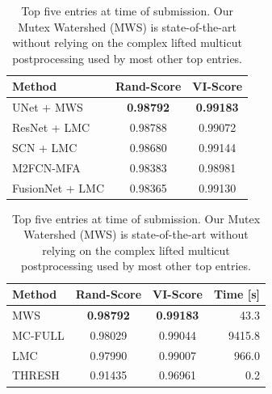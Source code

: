 
\begin{table}[t]
    \centering
    \begin{subtable}[t!]{0.48\textwidth}\centering
        \begin{tabular}{l c c}
            \toprule
            Method                                  & \hspace{-0.5cm}Rand-Score & VI-Score \\        
            \midrule
            UNet + MWS                              & \textbf{0.98792} & \textbf{0.99183}\\        
            ResNet + LMC \cite{xiao2018deep}        & 0.98788   &  0.99072\\
            SCN + LMC \cite{weiler2017learning}     & 0.98680   &  0.99144\\
            M2FCN-MFA \cite{shen2017multi}         & 0.98383   &  0.98981\\
            FusionNet + LMC \cite{quan2016fusionnet}& 0.98365   &  0.99130\\ 
        \end{tabular}
        \caption{Top five entries at time of submission. Our Mutex Watershed (MWS) is state-of-the-art without relying on the complex lifted multicut postprocessing used by most other top entries.}
        \label{tab:isbi-leaderboard}
    \end{subtable} \quad 
    \par\bigskip
    \begin{subtable}[t!]{0.48\textwidth}\centering
        \begin{tabular}{l c c r}
            \toprule
            Method   & \hspace{-0.5cm}Rand-Score & VI-Score & Time [s] \\        
            \midrule
            MWS      & \textbf{0.98792} & \textbf{0.99183} & 43.3 \\        
            MC-FULL  & 0.98029   & 0.99044 & 9415.8 \\
		    LMC		 & 0.97990   & 0.99007 &  966.0 \\
            THRESH   & 0.91435   & 0.96961 & 0.2 \\

\end{tabular}
\end{subtable}
\end{table}
